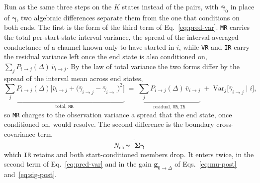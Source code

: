 \begin{appendixbox}
Run as the same three steps on the $K$ states instead of the pairs, with
$\bar{\bm{\gamma}}_0$ in place of $\bm{\gamma}$, two
algebraic differences separate them from the one that conditions on both ends. The first is
the form of the third term of Eq.~\ref{eq:pred-var}.
\texttt{MR} carries the total per-start-state interval variance, the spread of the
interval-averaged conductance of a channel known only to have started in $i$, while
\texttt{VR} and \texttt{IR} carry the residual variance left once the end state is also
conditioned on, $\sum_{j} P_{i\to j}(\Delta)\,\bar{v}_{i\to j}$. By the law
of total variance the two forms differ by the spread of the interval mean across end
states,
\begin{equation}
  \underbrace{\sum_{j} P_{i\to j}(\Delta)\bigl[\bar{v}_{i\to j}
    + \bigl(\bar{\gamma}_{i\to j}-\bar{\gamma}_{i\to\cdot}\bigr)^2\bigr]}_{\text{total, }\texttt{MR}}
  \;=\; \underbrace{\sum_{j} P_{i\to j}(\Delta)\,\bar{v}_{i\to j}}_{\text{residual, }\texttt{VR},\,\texttt{IR}}
  \;+\; \mathrm{Var}_{j}\bigl[\bar{\gamma}_{i\to j}\mid i\bigr],
  \label{eq:mr-vr}
\end{equation}
so \texttt{MR} charges to the observation variance a spread that the end state, once
conditioned on, would resolve. The second difference is the boundary cross-covariance term
\begin{equation}
  N_{\mathrm{ch}}\,\widetilde{\bm{\gamma}^\top\bm{\Sigma}\bm{\gamma}}
  \label{eq:mr-ir}
\end{equation}
which \texttt{IR} retains and both start-conditioned members drop. It enters twice, in the
second term of Eq.~\ref{eq:pred-var} and in the gain $\mathbf{g}_{0\to\Delta}$ of
Eqs.~\ref{eq:mu-post} and~\ref{eq:sig-post}.


\end{appendixbox}
